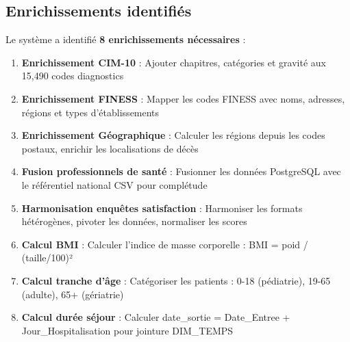 \subsection{Enrichissements identifiés}

Le système a identifié \textbf{8 enrichissements nécessaires} :

\begin{enumerate}[leftmargin=*]
    \item \textbf{Enrichissement CIM-10} : Ajouter chapitres, catégories et gravité aux 15,490 codes diagnostics
    \item \textbf{Enrichissement FINESS} : Mapper les codes FINESS avec noms, adresses, régions et types d'établissements
    \item \textbf{Enrichissement Géographique} : Calculer les régions depuis les codes postaux, enrichir les localisations de décès
    \item \textbf{Fusion professionnels de santé} : Fusionner les données PostgreSQL avec le référentiel national CSV pour complétude
    \item \textbf{Harmonisation enquêtes satisfaction} : Harmoniser les formats hétérogènes, pivoter les données, normaliser les scores
    \item \textbf{Calcul BMI} : Calculer l'indice de masse corporelle : BMI = poid / (taille/100)²
    \item \textbf{Calcul tranche d'âge} : Catégoriser les patients : 0-18 (pédiatrie), 19-65 (adulte), 65+ (gériatrie)
    \item \textbf{Calcul durée séjour} : Calculer date_sortie = Date_Entree + Jour_Hospitalisation pour jointure DIM_TEMPS
\end{enumerate}

